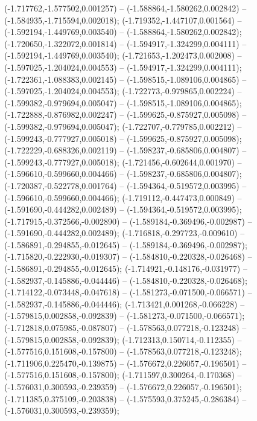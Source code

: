  (-1.717762,-1.577502,0.001257) -- (-1.588864,-1.580262,0.002842) -- (-1.584935,-1.715594,0.002018);
 (-1.719352,-1.447107,0.001564) -- (-1.592194,-1.449769,0.003540) -- (-1.588864,-1.580262,0.002842);
 (-1.720650,-1.322072,0.001814) -- (-1.594917,-1.324299,0.004111) -- (-1.592194,-1.449769,0.003540);
 (-1.721653,-1.202473,0.002008) -- (-1.597025,-1.204024,0.004553) -- (-1.594917,-1.324299,0.004111);
 (-1.722361,-1.088383,0.002145) -- (-1.598515,-1.089106,0.004865) -- (-1.597025,-1.204024,0.004553);
 (-1.722773,-0.979865,0.002224) -- (-1.599382,-0.979694,0.005047) -- (-1.598515,-1.089106,0.004865);
 (-1.722888,-0.876982,0.002247) -- (-1.599625,-0.875927,0.005098) -- (-1.599382,-0.979694,0.005047);
 (-1.722707,-0.779785,0.002212) -- (-1.599243,-0.777927,0.005018) -- (-1.599625,-0.875927,0.005098);
 (-1.722229,-0.688326,0.002119) -- (-1.598237,-0.685806,0.004807) -- (-1.599243,-0.777927,0.005018);
 (-1.721456,-0.602644,0.001970) -- (-1.596610,-0.599660,0.004466) -- (-1.598237,-0.685806,0.004807);
 (-1.720387,-0.522778,0.001764) -- (-1.594364,-0.519572,0.003995) -- (-1.596610,-0.599660,0.004466);
 (-1.719112,-0.447473,0.000849) -- (-1.591690,-0.444282,0.002489) -- (-1.594364,-0.519572,0.003995);
 (-1.717915,-0.372566,-0.002890) -- (-1.589184,-0.369496,-0.002987) -- (-1.591690,-0.444282,0.002489);
 (-1.716818,-0.297723,-0.009610) -- (-1.586891,-0.294855,-0.012645) -- (-1.589184,-0.369496,-0.002987);
 (-1.715820,-0.222930,-0.019307) -- (-1.584810,-0.220328,-0.026468) -- (-1.586891,-0.294855,-0.012645);
 (-1.714921,-0.148176,-0.031977) -- (-1.582937,-0.145886,-0.044446) -- (-1.584810,-0.220328,-0.026468);
 (-1.714122,-0.073448,-0.047618) -- (-1.581273,-0.071500,-0.066571) -- (-1.582937,-0.145886,-0.044446);
 (-1.713421,0.001268,-0.066228) -- (-1.579815,0.002858,-0.092839) -- (-1.581273,-0.071500,-0.066571);
 (-1.712818,0.075985,-0.087807) -- (-1.578563,0.077218,-0.123248) -- (-1.579815,0.002858,-0.092839);
 (-1.712313,0.150714,-0.112355) -- (-1.577516,0.151608,-0.157800) -- (-1.578563,0.077218,-0.123248);
 (-1.711906,0.225470,-0.139875) -- (-1.576672,0.226057,-0.196501) -- (-1.577516,0.151608,-0.157800);
 (-1.711597,0.300264,-0.170368) -- (-1.576031,0.300593,-0.239359) -- (-1.576672,0.226057,-0.196501);
 (-1.711385,0.375109,-0.203838) -- (-1.575593,0.375245,-0.286384) -- (-1.576031,0.300593,-0.239359);

